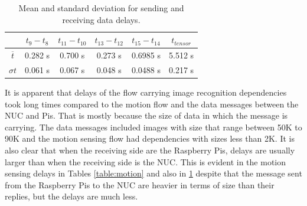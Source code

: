 \begin{table}[H]
\centering
\begin{tabular}{c|c|c|c|c|c}	\toprule
&$t_9 - t_8$  & $t_{11} - t_{10}$  & $t_{13}-t_{12}$ & $t_{15}-t_{14}$&  $t_{tensor}$ \\ \midrule
$ \overline{t} $&0.282 s&0.700 s&	0.273 s&0.6985 s&5.512 s\\
$ \sigma t $&0.061 s&0.067 s&	0.048 s&0.0488 s&0.217 s\\
	\end{tabular}
	\caption{Mean and standard deviation for sending and receiving data delays.}
	\label{table:data}
\end{table}

\noindent It is apparent that delays of the flow carrying image recognition dependencies took long times compared to the motion flow and the data messages between the NUC and Pis. That is mostly because the size of data in which the message is carrying. The data messages included images with size that range  between 50K to 90K  and the motion sensing flow had dependencies with sizes less than 2K. It is also clear that when the receiving side are the Raspberry Pis, delays are usually larger than when the receiving side is the NUC. This is evident in the motion sensing delays in Tables \ref{table:motion} and  also in \ref{table:data} despite that the message sent from the Raspberry Pis to the NUC are heavier   in terms of size than their replies, but the delays are much less.

